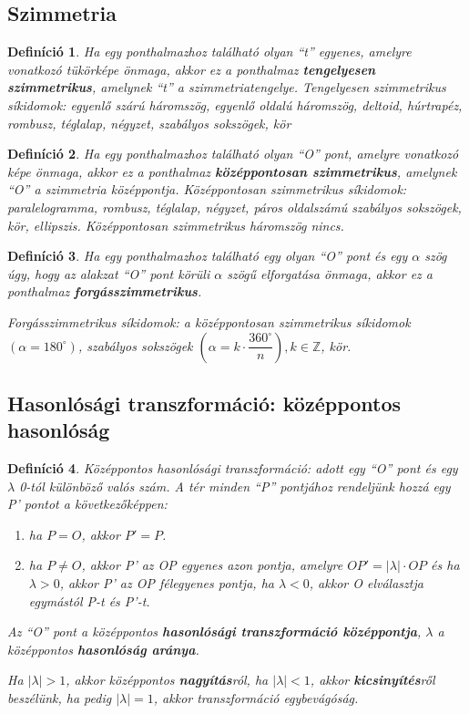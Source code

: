 \documentclass[12pt,a4paper]{article}
\newtheorem{definition}{Definíció} [section]
\begin{document}
\subsection{Szimmetria}

\begin{definition}
Ha egy ponthalmazhoz található olyan ``t'' egyenes, amelyre vonatkozó tükörképe önmaga, akkor ez a ponthalmaz \textbf{tengelyesen szimmetrikus}, amelynek ``t'' a szimmetriatengelye. Tengelyesen szimmetrikus síkidomok: egyenlő szárú háromszög, egyenlő oldalú háromszög, deltoid, húrtrapéz, rombusz, téglalap, négyzet, szabályos sokszögek, kör
\end{definition}

\begin{definition}
Ha egy ponthalmazhoz található olyan ``O'' pont, amelyre vonatkozó képe önmaga, akkor ez a ponthalmaz \textbf{középpontosan szimmetrikus}, amelynek ``O'' a szimmetria középpontja. Középpontosan szimmetrikus síkidomok: paralelogramma, rombusz, téglalap, négyzet, páros oldalszámú szabályos sokszögek, kör, ellipszis. Középpontosan szimmetrikus háromszög nincs.
\end{definition}

\begin{definition}
Ha egy ponthalmazhoz található egy olyan ``O'' pont és egy $\alpha$ szög úgy, hogy az alakzat ``O'' pont körüli $\alpha$ szögű elforgatása önmaga, akkor ez a ponthalmaz \textbf{forgásszimmetrikus}.

Forgásszimmetrikus síkidomok: a középpontosan szimmetrikus síkidomok $(\alpha = 180^\circ)$, szabályos sokszögek $\left(\alpha=k\cdot \dfrac{360^\circ}{n}\right), k\in \mathbb{Z}$, kör.
\end{definition}

\subsection{Hasonlósági transzformáció: középpontos hasonlóság}

\begin{definition}
Középpontos hasonlósági transzformáció: adott egy ``O'' pont és egy $\lambda$ 0-tól különböző valós szám. A tér minden ``P'' pontjához rendeljünk hozzá egy P’ pontot a következőképpen:
\begin{enumerate}
\item ha $P=O$, akkor $P'=P$.
\item ha $P\neq O$, akkor P' az OP egyenes azon pontja, amelyre $OP'=|\lambda|\cdot OP$ és ha $\lambda>0$, akkor P' az OP félegyenes pontja, ha $\lambda<0$, akkor O elválasztja egymástól P-t és P'-t.
\end{enumerate}
Az ``O'' pont a középpontos \textbf{hasonlósági transzformáció középpontja}, $\lambda$ a középpontos \textbf{hasonlóság aránya}.

Ha $|\lambda|>1$, akkor középpontos \textbf{nagyítás}ról, ha $|\lambda|<1$, akkor \textbf{kicsinyítés}ről beszélünk, ha pedig $|\lambda|=1$, akkor transzformáció egybevágóság.
\end{definition}
\end{document}
